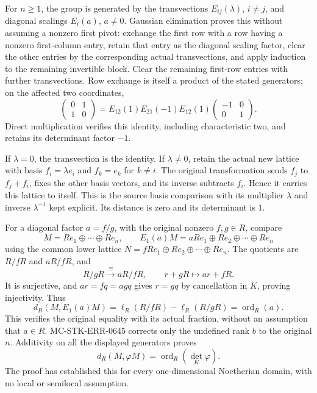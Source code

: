For \(n\ge1\), the group is generated by the transvections \(E_{ij}(\lambda)\), \(i\ne j\), and diagonal scalings \(E_i(a)\), \(a\ne0\). Gaussian elimination proves this without assuming a nonzero first pivot: exchange the first row with a row having a nonzero first-column entry, retain that entry as the diagonal scaling factor, clear the other entries by the corresponding actual transvections, and apply induction to the remaining invertible block. Clear the remaining first-row entries with further transvections. Row exchange is itself a product of the stated generators; on the affected two coordinates, \[
 \begin{pmatrix}0&1\\1&0\end{pmatrix}
 =E_{12}(1)E_{21}(-1)E_{12}(1)
       \begin{pmatrix}-1&0\\0&1\end{pmatrix}.
\] Direct multiplication verifies this identity, including characteristic two, and retains its determinant factor \(-1\).

If \(\lambda=0\), the transvection is the identity. If \(\lambda\ne0\), retain the actual new lattice with basis \(f_i=\lambda e_i\) and \(f_k=e_k\) for \(k\ne i\). The original transformation sends \(f_j\) to \(f_j+f_i\), fixes the other basis vectors, and its inverse subtracts \(f_i\). Hence it carries this lattice to itself. This is the source basis comparison with its multiplier \(\lambda\) and inverse \(\lambda^{-1}\) kept explicit. Its distance is zero and its determinant is \(1\).

For a diagonal factor \(a=f/g\), with the original nonzero \(f,g\in R\), compare \[
 M=Re_1\oplus\cdots\oplus Re_n,\qquad
 E_1(a)M=aRe_1\oplus Re_2\oplus\cdots\oplus Re_n
\] using the common lower lattice \(N=fRe_1\oplus Re_2\oplus\cdots\oplus Re_n\). The quotients are \(R/fR\) and \(aR/fR\), and \[
 R/gR\xrightarrow{\cong}aR/fR,\qquad r+gR\longmapsto ar+fR.
\] It is surjective, and \(ar=fq=agq\) gives \(r=gq\) by cancellation in \(K\), proving injectivity. Thus \[
 d_R(M,E_1(a)M)=\ell_R(R/fR)-\ell_R(R/gR)
              =\operatorname{ord}_R(a).
\] This verifies the original equality with its actual fraction, without an assumption that \(a\in R\). MC-\AlgebraIdentifierBreak{}STK-\AlgebraIdentifierBreak{}ERR-\AlgebraIdentifierBreak{}0645 corrects only the undefined rank \(b\) to the original \(n\). Additivity on all the displayed generators proves \[
 d_R(M,\varphi M)=\operatorname{ord}_R(\det_K\varphi).
\] The proof has established this for every one-dimensional Noetherian domain, with no local or semilocal assumption.

